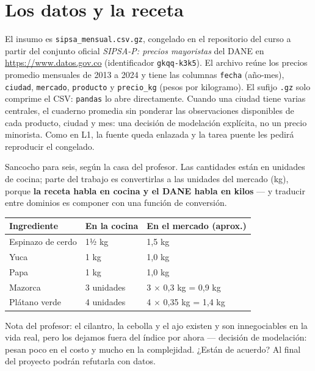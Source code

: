 \documentclass[12pt,letterpaper]{article}
\begin{document}
\section{Los datos y la receta}
El insumo es \texttt{sipsa\_mensual.csv.gz}, congelado en el repositorio del curso a partir del conjunto oficial \emph{SIPSA-P: precios mayoristas} del DANE en \url{https://www.datos.gov.co} (identificador \texttt{gkqq-k3k5}). El archivo reúne los precios promedio mensuales de 2013 a 2024 y tiene las columnas \texttt{fecha} (año-mes), \texttt{ciudad}, \texttt{mercado}, \texttt{producto} y \texttt{precio\_kg} (pesos por kilogramo). El sufijo \texttt{.gz} solo comprime el CSV: \texttt{pandas} lo abre directamente. Cuando una ciudad tiene varias centrales, el cuaderno promedia sin ponderar las observaciones disponibles de cada producto, ciudad y mes: una decisión de modelación explícita, no un precio minorista. Como en L1, la fuente queda enlazada y la tarea puente les pedirá reproducir el congelado.

\begin{cajareceta}
Sancocho para seis, según la casa del profesor. Las cantidades están en unidades de cocina; parte del trabajo es convertirlas a las unidades del mercado (kg), porque \textbf{la receta habla en cocina y el DANE habla en kilos} --- y traducir entre dominios es componer con una función de conversión.

\begin{center}
\begin{tabularx}{0.92\textwidth}{p{3.4cm}p{3.4cm}X}
\toprule
\textbf{Ingrediente} & \textbf{En la cocina} & \textbf{En el mercado (aprox.)}\\
\midrule
Espinazo de cerdo & 1½ kg & 1,5 kg\\
Yuca & 1 kg & 1,0 kg\\
Papa & 1 kg & 1,0 kg\\
Mazorca & 3 unidades & 3 $\times$ 0,3 kg = 0,9 kg\\
Plátano verde & 4 unidades & 4 $\times$ 0,35 kg = 1,4 kg\\
\bottomrule
\end{tabularx}
\end{center}

Nota del profesor: el cilantro, la cebolla y el ajo existen y son innegociables en la vida real, pero los dejamos fuera del índice por ahora --- decisión de modelación: pesan poco en el costo y mucho en la complejidad. ¿Están de acuerdo? Al final del proyecto podrán refutarla con datos.
\end{cajareceta}
\end{document}
